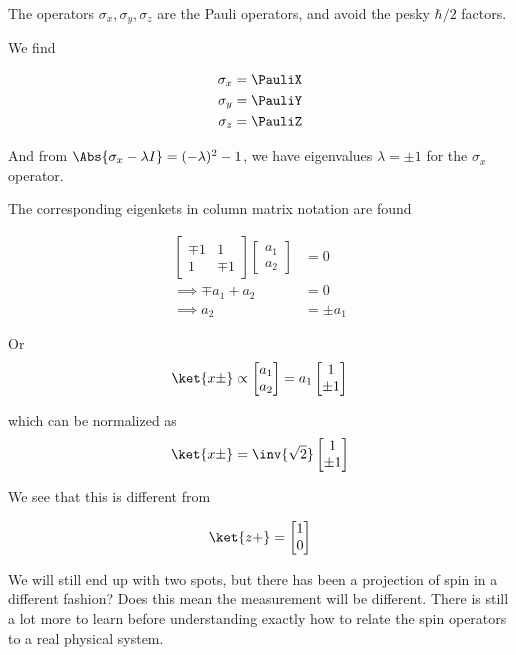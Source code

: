 The operators $\sigma_x, \sigma_y, \sigma_z$ are the Pauli operators, and avoid the pesky $\hbar/2$ factors.

We find

\begin{align}\label{eqn:PHY356Foct19:2010}
\sigma_x &= \PauliX \\
\sigma_y &= \PauliY \\
\sigma_z &= \PauliZ
\end{align}

And from $\Abs{\sigma_x - \lambda I} = (-\lambda)^2 -1$, we have eigenvalues $\lambda = \pm 1$ for the $\sigma_x$ operator.

The corresponding eigenkets in column matrix notation are found

\begin{align*}
\begin{bmatrix}
\mp 1 & 1 \\
1 & \mp 1
\end{bmatrix}
\begin{bmatrix}
a_1 \\
a_2
\end{bmatrix}
&= 0 \\
\implies
\mp a_1 + a_2 &= 0 \\
\implies
a_2 &= \pm a_1
\end{align*}

Or
\begin{align*}
\ket{x\pm} \propto
\begin{bmatrix}
a_1 \\
a_2
\end{bmatrix}
=
a_1
\begin{bmatrix}
1 \\
\pm 1
\end{bmatrix}
\end{align*}

which can be normalized as
\begin{align}\label{eqn:PHY356Foct19:2011}
\ket{x\pm} =
\inv{\sqrt{2}}
\begin{bmatrix}
1 \\
\pm 1
\end{bmatrix}
\end{align}

We see that this is different from

\begin{align}\label{eqn:PHY356Foct19:2012}
\ket{z+} =
\begin{bmatrix}
1 \\
0
\end{bmatrix}
\end{align}

We will still end up with two spots, but there has been a projection of spin in a different fashion?  Does this mean the measurement will be different.  There is still a lot more to learn before understanding exactly how to relate the spin operators to a real physical system.

